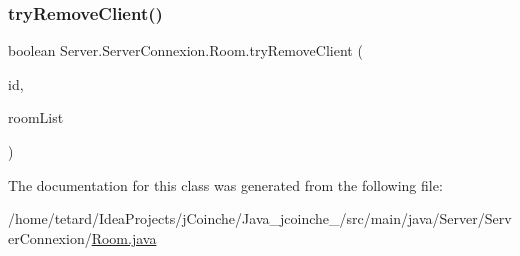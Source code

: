 \mbox{\label{classServer_1_1ServerConnexion_1_1Room_a5b478e86f07cb7f40db27f8db26fb955}} 
\subsubsection{\texorpdfstring{try\+Remove\+Client()}{tryRemoveClient()}}
{\footnotesize\ttfamily boolean Server.\+Server\+Connexion.\+Room.\+try\+Remove\+Client (\begin{DoxyParamCaption}\item[{Integer}]{id,  }\item[{Concurrent\+Hash\+Map$<$ Integer, \mbox{\hyperlink{classServer_1_1ServerConnexion_1_1Room}{Room}} $>$}]{room\+List }\end{DoxyParamCaption})\hspace{0.3cm}{\ttfamily [inline]}}



The documentation for this class was generated from the following file\+:\begin{DoxyCompactItemize}
\item 
/home/tetard/\+Idea\+Projects/j\+Coinche/\+Java\+\_\+jcoinche\+\_/src/main/java/\+Server/\+Server\+Connexion/\mbox{\hyperlink{Room_8java}{Room.\+java}}\end{DoxyCompactItemize}
